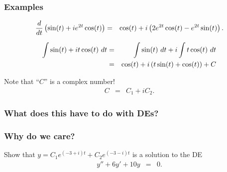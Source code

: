 \begin{frame}
  \frametitle{Examples}

  \begin{eqnarray*}
    \frac{d}{dt} \left( \sin(t) + i e^{2t} \cos(t) \right) & = & 
    \cos(t) + i \left( 2 e^{2t} \cos(t) - e^{2t} \sin(t) \right).
  \end{eqnarray*}

  \begin{eqnarray*}
    \int \sin(t) + i t \cos(t) ~ dt & = & 
    \int \sin(t) ~ dt + i \int t \cos(t) ~ dt \\
    & = & \cos(t) + i \left( t\sin(t) + \cos(t) \right) + C
  \end{eqnarray*}

  Note that ``$C$'' is a complex number!
  \begin{eqnarray*}
    C & = & C_1 + i C_2.
  \end{eqnarray*}

\end{frame}


\subsubsection{What does this have to do with DEs?}

\begin{frame}
  \frametitle{Why do we care?}

  Show that $y=C_1 e^{(-3+i)t} + C_2 e^{(-3-i)t}$ is a solution to the DE
  \begin{eqnarray*}
    y'' + 6y' + 10y & = & 0.
  \end{eqnarray*}

\end{frame}





